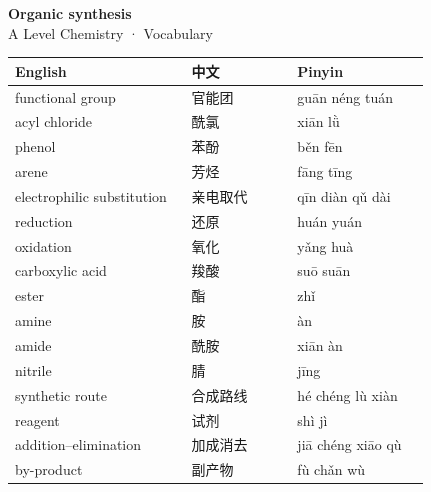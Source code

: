\documentclass[11pt]{article}
\begin{document}
\begin{center}
  {\LARGE\bfseries Organic synthesis}\\[0.35em]
  {\large A Level Chemistry · Vocabulary}
\end{center}
\vspace{0.6em}

\begin{longtable}{@{}p{0.40\linewidth}p{0.24\linewidth}p{0.30\linewidth}@{}}
\toprule
\textbf{English} & \textbf{中文} & \textbf{Pinyin} \\
\midrule
\endhead
\bottomrule
\endlastfoot
functional group & 官能团 & guān néng tuán \\
acyl chloride & 酰氯 & xiān lǜ \\
phenol & 苯酚 & běn fēn \\
arene & 芳烃 & fāng tīng \\
electrophilic substitution & 亲电取代 & qīn diàn qǔ dài \\
reduction & 还原 & huán yuán \\
oxidation & 氧化 & yǎng huà \\
carboxylic acid & 羧酸 & suō suān \\
ester & 酯 & zhǐ \\
amine & 胺 & àn \\
amide & 酰胺 & xiān àn \\
nitrile & 腈 & jīng \\
synthetic route & 合成路线 & hé chéng lù xiàn \\
reagent & 试剂 & shì jì \\
addition–elimination & 加成消去 & jiā chéng xiāo qù \\
by-product & 副产物 & fù chǎn wù \\
\end{longtable}
\end{document}
